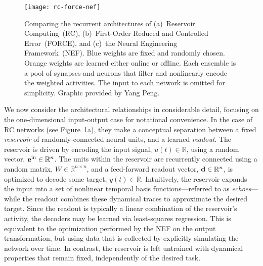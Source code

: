 \begin{figure}
  \centering
  \texttt{[image: rc-force-nef]}
  \caption[Architectural differences between FORCE, RC, and the NEF.]{ \label{fig:architectures}
    Comparing the recurrent architectures of (a)~Reservoir Computing~(RC), (b)~First-Order Reduced and Controlled Error~(FORCE), and (c)~the Neural Engineering Framework~(NEF).
    Blue weights are fixed and randomly chosen.
    Orange weights are learned either online or offline.
    Each ensemble is a pool of synapses and neurons that filter and nonlinearly encode the weighted activities.
    The input to each network is omitted for simplicity.
    Graphic provided by Yang Peng.
  }
\end{figure}


We now consider the architectural relationships in considerable detail, focusing on the one-dimensional input-output case for notational convenience.
In the case of RC networks (see Figure~\ref{fig:architectures}a), they make a conceptual separation between a fixed {\it reservoir} of randomly-connected neural units, and a learned {\it readout}.
The reservoir is driven by encoding the input signal, $u(t) \in \mathbb{R}$, using a random vector, $\mathbf{e}^\text{in} \in \mathbb{R}^n$.
The units within the reservoir are recurrently connected using a random matrix, $W \in \mathbb{R}^{n \times n}$,
and a feed-forward readout vector, $\mathbf{d} \in \mathbb{R}^{n}$, is optimized to decode some target, $y(t) \in \mathbb{R}$.
Intuitively, the reservoir expands the input into a set of nonlinear temporal basis functions---referred to as {\it echoes}---while the readout combines these dynamical traces to approximate the desired target.
Since the readout is typically a linear combination of the reservoir's activity, the decoders may be learned via least-squares regression.
This is equivalent to the optimization performed by the NEF on the output transformation, but using data that is collected by explicitly simulating the network over time.
In contrast, the reservoir is left untrained with dynamical properties that remain fixed, independently of the desired task.

